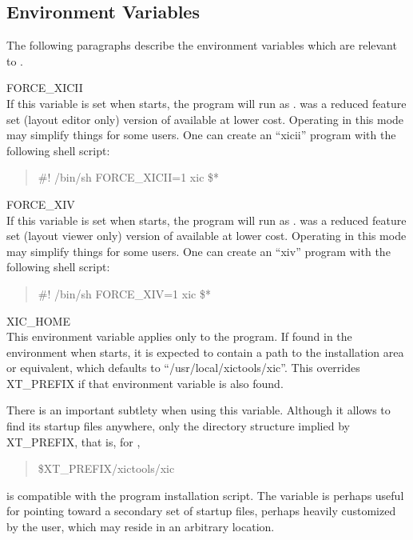 \subsection{{\Xic} Environment Variables}

The following paragraphs describe the environment variables which are
relevant to {\Xic}.

\begin{description}
\item{\et FORCE\_XICII}\\
If this variable is set when {\Xic} starts, the program will run as
{\XicII}.  {\XicII} was a reduced feature set (layout editor only)
version of {\Xic} available at lower cost.  Operating in this mode may
simplify things for some users.  One can create an ``{\vt xicii}''
program with the following shell script:

\begin{quote}\vt
\#! /bin/sh\newline\newline
FORCE\_XICII=1 xic \$*
\end{quote}

\item{\et FORCE\_XIV}\\
If this variable is set when {\Xic} starts, the program will run as
{\Xiv}.  {\Xiv} was a reduced feature set (layout viewer only) version
of {\Xic} available at lower cost.  Operating in this mode may
simplify things for some users.  One can create an ``{\vt xiv}''
program with the following shell script:

\begin{quote}\vt
\#! /bin/sh\newline\newline
FORCE\_XIV=1 xic \$*
\end{quote}

\item{\et XIC\_HOME}\\
This environment variable applies only to the {\Xic} program.  If
found in the environment when {\Xic} starts, it is expected to contain
a path to the {\Xic} installation area or equivalent, which defaults
to ``{\vt /usr/local/xictools/xic}''.  This overrides {\et XT\_PREFIX}
if that environment variable is also found.
 
There is an important subtlety when using this variable.  Although it
allows {\Xic} to find its startup files anywhere, only the directory
structure implied by {\et XT\_PREFIX}, that is, for {\Xic},
\begin{quote} \vt
\$XT\_PREFIX/xictools/xic
\end{quote}
is compatible with the program installation script.  The variable is
perhaps useful for pointing {\Xic} toward a secondary set of startup
files, perhaps heavily customized by the user, which may reside in
an arbitrary location.


\end{description}
